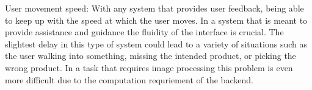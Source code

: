 User movement speed:
With any system that provides user feedback, being able to keep up with the speed at which the user moves. In a system that is meant to provide assistance and guidance the fluidity of the interface is crucial. The slightest delay in this type of system could lead to a variety of situations such as the user walking into something, missing the intended product, or picking the wrong product. In a task that requires image processing this problem is even more difficult due to the computation requriement of the backend.



